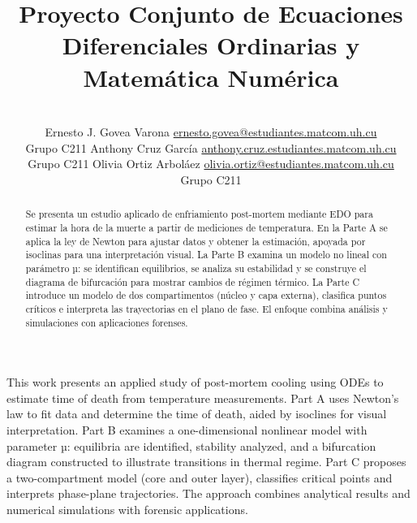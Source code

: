 \documentclass[a4paper,10pt]{article}
\title{Proyecto Conjunto de Ecuaciones Diferenciales Ordinarias y Matemática Numérica}
\author{\\
\name Ernesto J. Govea Varona \email \href{mailto:ernesto.govea@estudiantes.matcom.uh.cu}{ernesto.govea@estudiantes.matcom.uh.cu}
	\\ \addr Grupo C211 \AND
\name Anthony Cruz García \email \href{mailto:anthony.cruz.estudiantes.matcom.uh.cu}{anthony.cruz.estudiantes.matcom.uh.cu}
	\\ \addr Grupo C211 \AND
\name Olivia Ortiz Arboláez \email \href{mailto:olivia.ortiz@estudiantes.matcom.uh.cu}{olivia.ortiz@estudiantes.matcom.uh.cu}
	\\ \addr Grupo C211
}
\begin{document}
\maketitle


\begin{abstract}

  Se presenta un estudio aplicado de enfriamiento post-mortem mediante EDO para
  estimar la hora de la muerte a partir de mediciones de temperatura. En la
  Parte A se aplica la ley de Newton para ajustar datos y obtener la estimación,
  apoyada por isoclinas para una interpretación visual. La Parte B examina un
  modelo no lineal con parámetro µ: se identifican equilibrios, se analiza su
  estabilidad y se construye el diagrama de bifurcación para mostrar cambios de
  régimen térmico. La Parte C introduce un modelo de dos compartimentos (núcleo
  y capa externa), clasifica puntos críticos e interpreta las trayectorias en el
  plano de fase. El enfoque combina análisis y simulaciones con aplicaciones
  forenses.

\end{abstract}

\vspace{0.5cm}

\begin{enabstract}

	This work presents an applied study of post-mortem cooling using ODEs to
	estimate time of death from temperature measurements. Part A uses Newton's
	law to fit data and determine the time of death, aided by isoclines for visual
	interpretation. Part B examines a one-dimensional nonlinear model with
	parameter µ: equilibria are identified, stability analyzed, and a bifurcation
	diagram constructed to illustrate transitions in thermal regime. Part C
	proposes a two-compartment model (core and outer layer), classifies critical
	points and interprets phase-plane trajectories. The approach combines
	analytical results and numerical simulations with forensic applications.

\end{enabstract}
\end{document}
